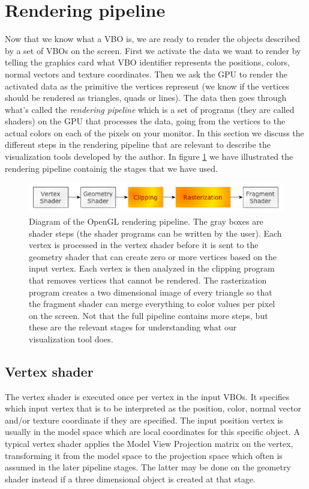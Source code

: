 \section{Rendering pipeline}
\label{sec:opengl_rendering_pipeline}
Now that we know what a VBO is, we are ready to render the objects described by a set of VBOs on the screen. First we activate the data we want to render by telling the graphics card what VBO identifier represents the positions, colors, normal vectors and texture coordinates. Then we ask the GPU to render the activated data as the primitive the vertices represent (we know if the vertices should be rendered as triangles, quads or lines). The data then goes through what's called the \textit{rendering pipeline} which is a set of programs (they are called shaders) on the GPU that processes the data, going from the vertices to the actual colors on each of the pixels on your monitor. In this section we discuss the different steps in the rendering pipeline that are relevant to describe the visualization tools developed by the author. In figure \ref{fig:opengl_rendering_pipeline} we have illustrated the rendering pipeline containig the stages that we have used. 
\begin{figure}[h]
\begin{center}
\includegraphics[width=\textwidth, trim=0cm 0cm 0cm 0cm, clip]{opengl/figures/pipeline.png}
\end{center}
\caption{Diagram of the OpenGL rendering pipeline. The gray boxes are shader steps (the shader programs can be written by the user). Each vertex is processed in the vertex shader before it is sent to the geometry shader that can create zero or more vertices based on the input vertex. Each vertex is then analyzed in the clipping program that removes vertices that cannot be rendered. The rasterization program creates a two dimensional image of every triangle so that the fragment shader can merge everything to color values per pixel on the screen. Not that the full pipeline contains more steps, but these are the relevant stages for understanding what our visualization tool does.}
\label{fig:opengl_rendering_pipeline}
\end{figure}
\subsection{Vertex shader}
The vertex shader is executed once per vertex in the input VBOs. It specifies which input vertex that is to be interpreted as the position, color, normal vector and/or texture coordinate if they are specified. The input position vertex is usually in the model space which are local coordinates for this specific object. A typical vertex shader applies the Model View Projection matrix on the vertex, transforming it from the model space to the projection space which often is assumed in the later pipeline stages. The latter may be done on the geometry shader instead if a three dimensional object is created at that stage.
